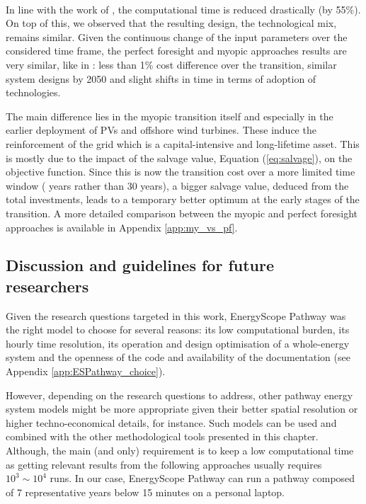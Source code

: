 \\

\noindent
In line with the work of \citet{babrowski2014reducing}, the computational time is reduced drastically (\ie by 55\%). On top of this, we observed that the resulting design, \ie the technological mix, remains similar.  Given the continuous change of the input parameters over the considered time frame, the perfect foresight and myopic approaches results are very similar, like in \cite{krey2006vergleich}: less than 1\% cost difference over the transition, similar system designs by 2050 and slight shifts in time in terms of adoption of technologies. 

The main difference lies in the myopic transition itself and especially in the earlier deployment of PVs and offshore wind turbines. These induce the reinforcement of the grid which is a capital-intensive and long-lifetime asset. This is mostly due to the impact of the salvage value, Equation (\ref{eq:salvage}), on the objective function. Since this is now the transition cost over a more limited time window ( years rather than 30 years), a bigger salvage value, deduced from the total investments, leads to a temporary better optimum at the early stages of the transition. A more detailed comparison between the myopic and perfect foresight approaches is available in Appendix \ref{app:my_vs_pf}.

\subsection{Discussion and guidelines for future researchers}
\label{subsec:meth:ES:discussion}
Given the research questions targeted in this work, EnergyScope Pathway was the right model to choose for several reasons: its low computational burden, its hourly time resolution, its operation and design optimisation of a whole-energy system and the openness of the code and availability of the documentation (see Appendix \ref{app:ESPathway_choice}). 

However, depending on the research questions to address, other pathway energy system models might be more appropriate given their better spatial resolution or higher techno-economical details, for instance. Such models can be used and combined with the other methodological tools presented in this chapter. Although, the main (and only) requirement is to keep a low computational time as getting relevant results from the following approaches usually requires $10^3\sim 10^4$ runs.  In our case, EnergyScope Pathway can run a pathway composed of 7 representative years below 15 minutes on a personal laptop.


